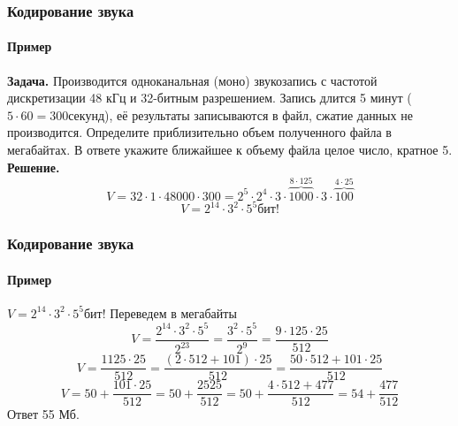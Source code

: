 \begin{frame}
\frametitle{Кодирование звука}
\framesubtitle{Пример}

\textbf{Задача.} Производится одноканальная (моно) звукозапись с частотой дискретизации 48 кГц и 32-битным разрешением. Запись длится 5 минут ($5\cdot 60=300$секунд), её результаты записываются в файл, сжатие данных не производится. Определите приблизительно объем полученного файла в мегабайтах. В ответе укажите ближайшее к объему файла целое число, кратное 5.\\ \pause
\textbf{Решение.} 
$$ V=32 \cdot 1\cdot 48000\cdot 300=2^5\cdot 2^4\cdot 3 \cdot \overbrace{1000}^{8\cdot125} \cdot 3\cdot \overbrace{100}^{4\cdot 25}$$
$$ V=2^{14}\cdot 3^2 \cdot 5^5 бит!$$



\end{frame}
\begin{frame}
\frametitle{Кодирование звука}
\framesubtitle{Пример}


$V=2^{14}\cdot 3^2 \cdot 5^5$бит! Переведем в мегабайты
$$ V=\frac{2^{14}\cdot 3^2 \cdot 5^5}{2^{23}}=\frac{3^2 \cdot 5^5}{2^{9}}=\frac{9\cdot125 \cdot 25}{512}$$
$$ V=\frac{1125 \cdot 25}{512}=\frac{(2\cdot 512+ 101)\cdot 25}{512}=\frac{50\cdot 512+ 101\cdot 25}{512}$$
$$ V=50+\frac{101\cdot 25}{512}=50+\frac{2525}{512}=50+\frac{4\cdot 512 +477}{512}=54+\frac{477}{512}$$
Ответ 55 Мб.



\end{frame}
